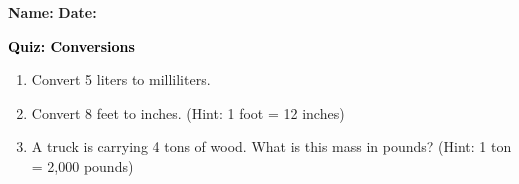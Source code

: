 \documentclass[12pt, letterpaper, fleqn]{article}
\begin{document}
\textbf{Name:} \underline{\hspace{5cm}}
\hfill
\textbf{Date:} \underline{\hspace{3cm}}\\

\begin{tcolorbox}[colback=customteal!20]
    \large\textcolor{black}{\textbf{Quiz: Conversions}}
\end{tcolorbox}
\begin{enumerate}[itemsep=3.5cm, leftmargin=0.6cm]
\item Convert 5 liters to milliliters.
\vspace{3.5cm}
\item Convert 8 feet to inches. (Hint: 1 foot = 12 inches)
\vspace{3.5cm}
\item A truck is carrying 4 tons of wood. What is this mass in pounds? (Hint: 1 ton = 2,000 pounds)
\end{enumerate}
\end{document}
